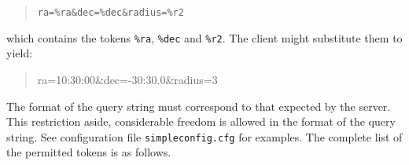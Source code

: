 \documentclass[twoside,11pt,nolof,chapters]{starlink}
\begin{document}
\begin{quote}
\verb-ra=%ra&dec=%dec&radius=%r2-
\end{quote}

which contains the tokens \texttt{\%ra}, \texttt{\%dec} and \texttt{\%r2}.  The
client might substitute them to yield:

\begin{quote}
\begin{terminalv}
ra=10:30:00&dec=-30:30.0&radius=3
\end{terminalv}
\end{quote}

The format of the query string must correspond to that expected by the
server.  This restriction aside, considerable freedom is allowed in the
format of the query string.  See configuration file \texttt{simpleconfig.cfg}
for examples.  The complete list of the permitted tokens is as follows.
\end{document}
